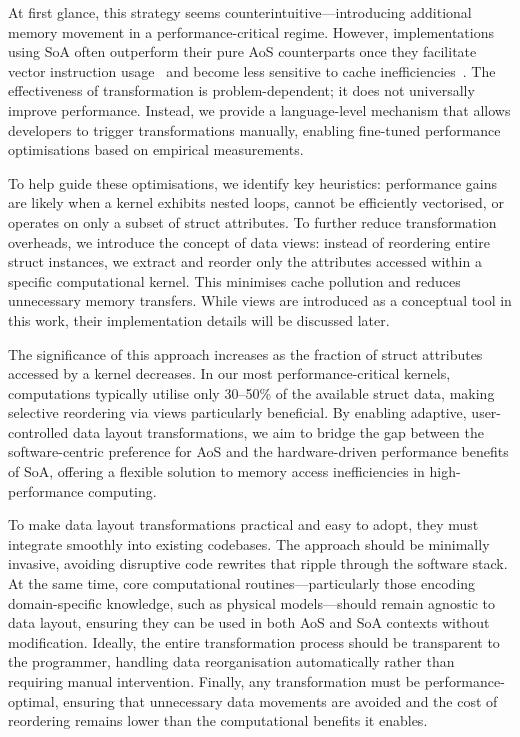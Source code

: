 At first glance, this strategy seems counterintuitive—introducing additional memory movement in a performance-critical regime. However, implementations using SoA often outperform their pure AoS counterparts once they facilitate vector instruction usage~\cite{Gallard:2020:ExaHyPEVectorisation,Intel:MemoryLayoutTransformations,Springer:2018:SoALayout} and become less sensitive to cache inefficiencies~\cite{Homann:2018:SoAx,Hundt:2006:StructureLayoutOptimisation,Springer:2018:SoALayout}. The effectiveness of transformation is problem-dependent; it does not universally improve performance. Instead, we provide a language-level mechanism that allows developers to trigger transformations manually, enabling fine-tuned performance optimisations based on empirical measurements.

To help guide these optimisations, we identify key heuristics: performance gains are likely when a kernel exhibits nested loops, cannot be efficiently vectorised, or operates on only a subset of struct attributes. To further reduce transformation overheads, we introduce the concept of data views: instead of reordering entire struct instances, we extract and reorder only the attributes accessed within a specific computational kernel. This minimises cache pollution and reduces unnecessary memory transfers. While views are introduced as a conceptual tool in this work, their implementation details will be discussed later.

The significance of this approach increases as the fraction of struct attributes accessed by a kernel decreases. In our most performance-critical kernels, computations typically utilise only 30–50\% of the available struct data, making selective reordering via views particularly beneficial. By enabling adaptive, user-controlled data layout transformations, we aim to bridge the gap between the software-centric preference for AoS and the hardware-driven performance benefits of SoA, offering a flexible solution to memory access inefficiencies in high-performance computing.

To make data layout transformations practical and easy to adopt, they must integrate smoothly into existing codebases. The approach should be minimally invasive, avoiding disruptive code rewrites that ripple through the software stack. At the same time, core computational routines—particularly those encoding domain-specific knowledge, such as physical models—should remain agnostic to data layout, ensuring they can be used in both AoS and SoA contexts without modification. Ideally, the entire transformation process should be transparent to the programmer, handling data reorganisation automatically rather than requiring manual intervention. Finally, any transformation must be performance-optimal, ensuring that unnecessary data movements are avoided and the cost of reordering remains lower than the computational benefits it enables.

